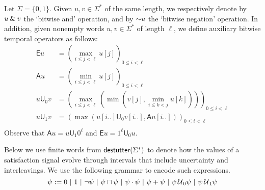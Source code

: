 Let $\Sigma = \{0,1\}$.
Given $u,v \in \Sigma^*$ of the same length, we respectively denote by $u \mathbin{\&} v$ the `bitwise and' operation, and by $\mathord{\sim} u$ the `bitwise negation' operation.
In addition, given nonempty words $u,v \in \Sigma^*$ of length $\ell$, we define auxiliary bitwise temporal operators as follows:
\begin{align*}
\mathsf{E} u &= \left( \max_{i \leq j < \ell} u[j] \right)_{0 \leq i < \ell} \\
\mathsf{A} u &= \left( \min_{i \leq j < \ell} u[j] \right)_{0 \leq i < \ell} \\
u \mathsf{U}_0 v &= \left( \max_{i \leq j < \ell} \left( \min \left( v[j], \min_{i \leq k < j} u[k] \right) \right) \right)_{0 \leq i < \ell} \\
u \mathsf{U}_1 v &= \left( \max \left( u[i..] \mathsf{U}_0 v[i..], \mathsf{A} u[i..] \right) \right)_{0 \leq i < \ell} \\
\end{align*}
Observe that $\mathsf{A} u = u \mathsf{U}_1 0^\ell$ and $\mathsf{E} u = 1^\ell \mathsf{U}_0 u$.

Below we use finite words from $\mathsf{destutter}(\Sigma^*)$ to denote how the values of a satisfaction signal evolve through intervals that include uncertainty and interleavings.
We use the following grammar to encode such expressions.
$$ \psi := 0 ~|~ 1 ~|~ \lnot \psi ~|~ \psi \sqcap \psi  ~|~ \psi \cdot \psi ~|~ \psi + \psi ~|~ \psi \,\mathcal{U}\,_{\!0} \psi ~|~ \psi \,\mathcal{U}\,_{\!1} \psi $$ %


